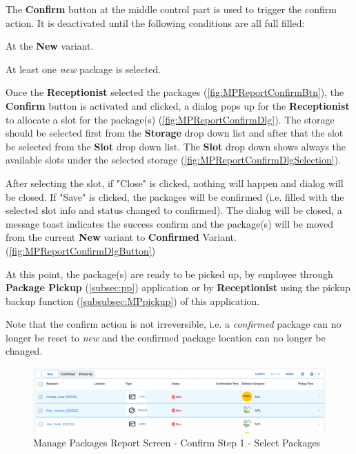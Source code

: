 The \textbf{Confirm} button at the middle control part is used to trigger the confirm action. It is deactivated until the following conditions are all full filled:

\begin{compactenum}
    \item At the \textbf{New} variant.
    \item At least one \textit{new} package is selected.
\end{compactenum}

\bigskip
Once the \textbf{Receptionist} selected the packages (\autoref{fig:MPReportConfirmBtn}), the \textbf{Confirm} button is activated and clicked, a dialog pops up for the \textbf{Receptionist} to allocate a slot for the package(s) (\autoref{fig:MPReportConfirmDlg}). The storage should be selected first from the \textbf{Storage} drop down list and after that the slot be selected from the \textbf{Slot} drop down list. The \textbf{Slot} drop down shows always the available slots under the selected storage (\autoref{fig:MPReportConfirmDlgSelection}).

After selecting the slot, if "Close" is clicked, nothing will happen and dialog will be closed. If "Save" is clicked, the packages will be confirmed (i.e. filled with the selected slot info and status changed to confirmed). The dialog will be closed, a message toast indicates the success confirm and the package(s) will be moved from the current \textbf{New} variant to \textbf{Confirmed} Variant. (\autoref{fig:MPReportConfirmDlgButton})

At this point, the package(s) are ready to be picked up, by employee through \textbf{Package Pickup} (\autoref{subsec:pp}) application or by \textbf{Receptionist} using the pickup backup function (\autoref{subsubsec:MPpickup}) of this application.

\bigskip
Note that the confirm action is not irreversible, i.e. a \textit{confirmed} package can no longer be reset to \textit{new} and the confirmed package location can no longer be changed.

\begin{figure}[H]
	\centering
	\includegraphics[width=1\linewidth]{images/user_doc/managePack/ReportScreen/browse/confirmActivated.png}
	\caption{Manage Packages Report Screen - Confirm Step 1 - Select Packages}
	\label{fig:MPReportConfirmBtn}
\end{figure}

